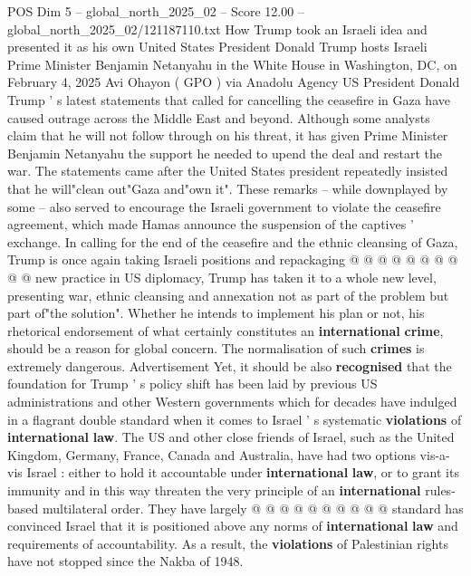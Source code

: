 \begin{textsample}{POS Dim 5 – global\_north\_2025\_02 – Score 12.00 – global\_north\_2025\_02/121187110.txt}  \label{ex:f5_pos_337}
How Trump took an Israeli idea and presented it as his own United States President Donald Trump hosts Israeli Prime Minister Benjamin Netanyahu in the White House in Washington, DC, on February 4, 2025 Avi Ohayon ( GPO ) via Anadolu Agency US President Donald Trump ' s latest statements that called for cancelling the ceasefire in Gaza have caused outrage across the Middle East and beyond.
Although some analysts claim that he will not follow through on his threat, it has given Prime Minister Benjamin Netanyahu the support he needed to upend the deal and restart the war.
The statements came after the United States president repeatedly insisted that he will"clean out"Gaza and"own it".
These remarks -- while downplayed by some -- also served to encourage the Israeli government to violate the ceasefire agreement, which made Hamas announce the suspension of the captives ' exchange.
In calling for the end of the ceasefire and the ethnic cleansing of Gaza, Trump is once again taking Israeli positions and repackaging @ @ @ @ @ @ @ @ @ @ new practice in US diplomacy, Trump has taken it to a whole new level, presenting war, ethnic cleansing and annexation not as part of the problem but part of"the solution".
Whether he intends to implement his plan or not, his rhetorical endorsement of what certainly constitutes an \textbf{international} \textbf{crime}, should be a reason for global concern.
The normalisation of such \textbf{crimes} is extremely dangerous.
Advertisement Yet, it should be also \textbf{recognised} that the foundation for Trump ' s policy shift has been laid by previous US administrations and other Western governments which for decades have indulged in a flagrant double standard when it comes to Israel ' s systematic \textbf{violations} of \textbf{international} \textbf{law}.
The US and other close friends of Israel, such as the United Kingdom, Germany, France, Canada and Australia, have had two options vis-a-vis Israel : either to hold it accountable under \textbf{international} \textbf{law}, or to grant its immunity and in this way threaten the very principle of an \textbf{international} rules-based multilateral order.
They have largely @ @ @ @ @ @ @ @ @ @ standard has convinced Israel that it is positioned above any norms of \textbf{international} \textbf{law} and requirements of accountability.
As a result, the \textbf{violations} of Palestinian rights have not stopped since the Nakba of 1948.

\end{textsample}
